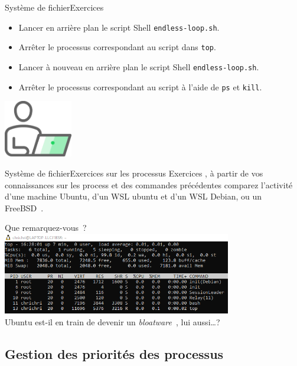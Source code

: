 \documentclass{beamer}
\begin{document}
    \begin{frame}{Système de fichier}{Exercices \execcounterdispinc{}}
        \begin{itemize}
            \item Lancer en arrière plan le script Shell \lstinline{endless-loop.sh}.
            \item Arrêter le processus correspondant au script dans \lstinline{top}.
            \item Lancer à nouveau en arrière plan le script Shell \lstinline{endless-loop.sh}.
            \item Arrêter le processus correspondant au script à l'aide de  \lstinline{ps} et \lstinline{kill}.
        \end{itemize}
        \bigbreak
        \centering
        \includegraphics[width=3cm]{image/guy-in-front-of-desktop}
    \end{frame}

    \begin{frame}{Système de fichier}{Exercices sur les processus}
        Exercices \execcounterdispinc{}, à partir de vos connaissances sur les process et des commandes précédentes comparez l'activité d'une machine Ubuntu, d'un WSL ubuntu et d'un WSL Debian, ou un FreeBSD~.

        Que remarquez-vous~?
        \pause
        \bigbreak
        \centering
        \includegraphics[width=10cm]{image/top-debian} \\ Ubuntu est-il en train de devenir un \textit{bloatware~}, lui aussi\ldots {}?
    \end{frame}

    \subsection{Gestion des priorités des processus}\label{subsec:process-priority}
\end{document}
